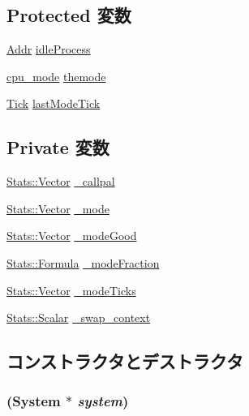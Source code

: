 \subsection*{Protected 変数}
\begin{DoxyCompactItemize}
\item 
\hyperlink{classm5_1_1params_1_1Addr}{Addr} \hyperlink{classAlphaISA_1_1Kernel_1_1Statistics_a3efac9018e8c40c2addf4a34b095cdfa}{idleProcess}
\item 
\hyperlink{namespaceAlphaISA_1_1Kernel_aa1fc3805dac6f71f457fbbc263105bf6}{cpu\_\-mode} \hyperlink{classAlphaISA_1_1Kernel_1_1Statistics_ac056a7cd50c440e44bd19d36c746b635}{themode}
\item 
\hyperlink{classm5_1_1params_1_1Tick}{Tick} \hyperlink{classAlphaISA_1_1Kernel_1_1Statistics_a7982ed5ce2b7a3c40fb9c593629cdaa0}{lastModeTick}
\end{DoxyCompactItemize}
\subsection*{Private 変数}
\begin{DoxyCompactItemize}
\item 
\hyperlink{classStats_1_1Vector}{Stats::Vector} \hyperlink{classAlphaISA_1_1Kernel_1_1Statistics_a1fccc9e1a165433b40d6b11d16d4f572}{\_\-callpal}
\item 
\hyperlink{classStats_1_1Vector}{Stats::Vector} \hyperlink{classAlphaISA_1_1Kernel_1_1Statistics_aa5d1b30e73436a048d5ad090cd6494ff}{\_\-mode}
\item 
\hyperlink{classStats_1_1Vector}{Stats::Vector} \hyperlink{classAlphaISA_1_1Kernel_1_1Statistics_ab95356a1073de976c621d1825898da43}{\_\-modeGood}
\item 
\hyperlink{classStats_1_1Formula}{Stats::Formula} \hyperlink{classAlphaISA_1_1Kernel_1_1Statistics_acfd81386f407c8e1d793f10cc42ca43d}{\_\-modeFraction}
\item 
\hyperlink{classStats_1_1Vector}{Stats::Vector} \hyperlink{classAlphaISA_1_1Kernel_1_1Statistics_a718f504e6efc6fe6c98ebe72d8146dc5}{\_\-modeTicks}
\item 
\hyperlink{classStats_1_1Scalar}{Stats::Scalar} \hyperlink{classAlphaISA_1_1Kernel_1_1Statistics_a2d48125412fd9180e98eeeb0adb8cad3}{\_\-swap\_\-context}
\end{DoxyCompactItemize}


\subsection{コンストラクタとデストラクタ}
\hypertarget{classAlphaISA_1_1Kernel_1_1Statistics_a83aac6d65afe578fbf92b926ce7c1c3c}{
\subsubsection[{Statistics}]{ ({\bf System} $\ast$ {\em system})}}
\label{classAlphaISA_1_1Kernel_1_1Statistics_a83aac6d65afe578fbf92b926ce7c1c3c}


